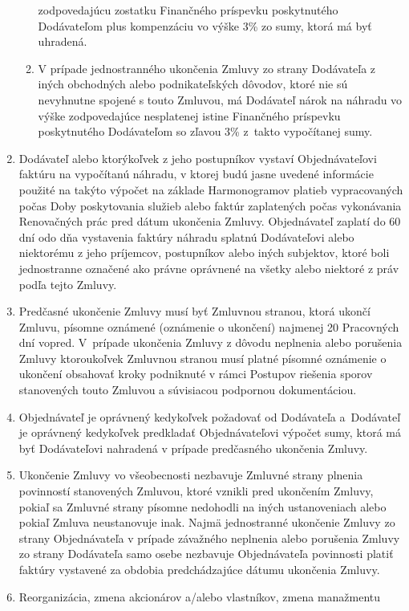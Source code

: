 \begin{multicols}{2}
\begin{enumerate}
\begin{enumerate}
    zodpovedajúcu zostatku Finančného príspevku poskytnutého Dodávateľom
    plus kompenzáciu vo výške 3\% zo sumy, ktorá má byť uhradená.
  \item
    V prípade jednostranného ukončenia Zmluvy zo strany Dodávateľa z
    iných obchodných alebo podnikateľských dôvodov, ktoré nie sú
    nevyhnutne spojené s touto Zmluvou, má Dodávateľ nárok na náhradu vo
    výške zodpovedajúce nesplatenej istine Finančného príspevku
    poskytnutého Dodávateľom so zľavou 3\% z~takto vypočítanej sumy.
  \end{enumerate}
\item
  Dodávateľ alebo ktorýkoľvek z jeho postupníkov vystaví Objednávateľovi
  faktúru na vypočítanú náhradu, v ktorej budú jasne uvedené informácie
  použité na takýto výpočet na základe Harmonogramov platieb
  vypracovaných počas Doby poskytovania služieb alebo faktúr zaplatených
  počas vykonávania Renovačných prác pred dátum ukončenia Zmluvy.
  Objednávateľ zaplatí do 60 dní odo dňa vystavenia faktúry náhradu
  splatnú Dodávateľovi alebo niektorému z jeho príjemcov, postupníkov
  alebo iných subjektov, ktoré boli jednostranne označené ako právne
  oprávnené na všetky alebo niektoré z práv podľa tejto Zmluvy.
\item
  Predčasné ukončenie Zmluvy musí byť Zmluvnou stranou, ktorá ukončí
  Zmluvu, písomne oznámené (oznámenie o ukončení) najmenej 20 Pracovných
  dní vopred. V~prípade ukončenia Zmluvy z dôvodu neplnenia alebo
  porušenia Zmluvy ktoroukoľvek Zmluvnou stranou musí platné písomné
  oznámenie o ukončení obsahovať kroky podniknuté v rámci Postupov
  riešenia sporov stanovených touto Zmluvou a súvisiacou podpornou
  dokumentáciou.
\item
  Objednávateľ je oprávnený kedykoľvek požadovať od Dodávateľa
  a~Dodávateľ je oprávnený kedykoľvek predkladať Objednávateľovi výpočet
  sumy, ktorá má byť Dodávateľovi nahradená v prípade predčasného
  ukončenia Zmluvy.
\item
  Ukončenie Zmluvy vo všeobecnosti nezbavuje Zmluvné strany plnenia
  povinností stanovených Zmluvou, ktoré vznikli pred ukončením Zmluvy,
  pokiaľ sa Zmluvné strany písomne nedohodli na iných ustanoveniach
  alebo pokiaľ Zmluva neustanovuje inak. Najmä jednostranné ukončenie
  Zmluvy zo strany Objednávateľa v prípade závažného neplnenia alebo
  porušenia Zmluvy zo strany Dodávateľa samo osebe nezbavuje
  Objednávateľa povinnosti platiť faktúry vystavené za obdobia
  predchádzajúce dátumu ukončenia Zmluvy.
\item
  Reorganizácia, zmena akcionárov a/alebo vlastníkov, zmena manažmentu

\end{enumerate}
\end{multicols}
